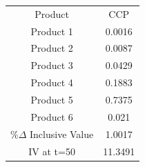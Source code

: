 \begin{tabular}{cc}
Product & CCP \\
Product 1 & 0.0016 \\
Product 2 & 0.0087 \\
Product 3 & 0.0429 \\
Product 4 & 0.1883 \\
Product 5 & 0.7375 \\
Product 6 & 0.021 \\
$\%\Delta$ Inclusive Value & 1.0017 \\
IV at t=50 & 11.3491 \\
\end{tabular}